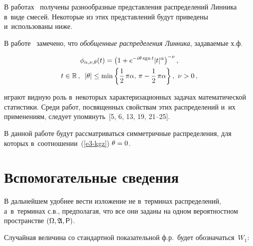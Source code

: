 \begin{multicols}{2}
В работах~\cite{Pakes1998, KotzOstrovskii1996, KorolevZeifman2016,
KorolevZeifmanKMJ} получены разнообразные представления
распределений Линника в~виде смесей. Некоторые из этих представлений
будут приведены и~использованы ниже.

В работе~\cite{Pakes1998} замечено, что \textit{обобщенные
распределения Линника}, задаваемые х.ф.

\vspace*{-6pt}

\noindent
\begin{multline}
\phi_{\alpha,\nu,\theta}(t)=
\left(1+e^{-i\theta\,{\mathrm{sgn}\,t}}|t|^{\alpha}\right)^{-\nu},\\
t\in\mathbb{R}\,,\enskip
|\theta|\le\min\left\{\displaystyle\frac{\displaystyle 1\mathstrut}{\displaystyle 2\mathstrut}\,\pi\alpha,\,\pi-\displaystyle\frac{\displaystyle 1\mathstrut}{\displaystyle 2\mathstrut}\,\pi\alpha\right\},\
\nu>0\,,
\label{e3-kgz}
\end{multline}

\vspace*{-1pt}

\noindent
играют видную роль в~некоторых характеризационных задачах
математической статистики. Среди работ, посвященных свойствам этих
распределений и~их применениям, следует упомянуть~[5, 6, 13, 19, 21--25].

В данной работе будут рассматриваться сим\-мет\-рич\-ные распределения,
для которых в~соотношении~(\ref{e3-kgz}) $\theta\hm=0$.

\vspace*{-6pt}

\section{Вспомогательные сведения}

\vspace*{-3pt}

В дальнейшем удобнее вести изложение
не в~терминах распределений, а~в~терминах с.в., предполагая, что
все они заданы на одном вероятностном пространстве
$(\Omega,\mathfrak{A}, {\sf P})$.

Случайная величина со стандартной показательной ф.р.\ будет 
обозначаться~$W_1$: 


\end{multicols}
